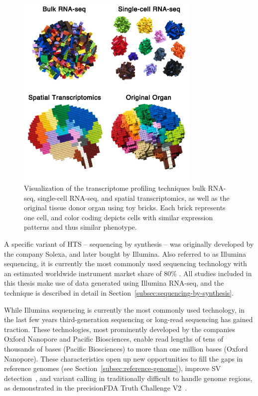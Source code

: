\documentclass[11pt]{book}
\begin{document}
\begin{figure}[t]
\centering
\includegraphics[width=250pt]{img/transcriptomics_experiment_types.png}
\caption[Visualization of Transcriptome Profiling Techniques]{Visualization of the transcriptome profiling techniques bulk RNA-seq, single-cell RNA-seq, and spatial transcriptomics, as well as the original tissue donor organ using toy bricks. Each brick represents one cell, and color coding depicts cells with similar expression patterns and thus similar phenotype.}
\label{fig:transcriptomics-techniques}
\end{figure}

A specific variant of HTS -- sequencing by synthesis -- was originally developed by the company Solexa, and later bought by Illumina. Also referred to as Illumina sequencing, it is currently the most commonly used sequencing technology with an estimated worldwide instrument market share of 80\% \cite{illumina-market-share}. All studies included in this thesis make use of data generated using Illumina RNA-seq, and the technique is described in detail in Section~\ref{subsec:sequencing-by-synthesis}.

While Illumina sequencing is currently the most commonly used technology, in the last few years third-generation sequencing or long-read sequencing has gained traction. These technologies, most prominently developed by the companies Oxford Nanopore and Pacific Biosciences, enable read lengths of tens of thousands of bases (Pacific Biosciences) to more than one million bases (Oxford Nanopore). These characteristics open up new opportunities to fill the gaps in reference genomes (see Section~\ref{subsec:reference-genome}), improve SV detection~\cite{Mahmoud:2019}, and variant calling in traditionally difficult to handle genome regions, as demonstrated in the precisionFDA Truth Challenge V2~\cite{Olsen:2020}. 
\end{document}
